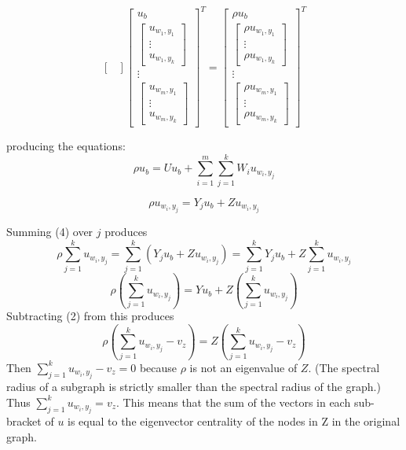 \documentclass{article}
\begin{document}
\[\begin{bmatrix}
\end{bmatrix}
 \begin{bmatrix}u_b \\
\begin{bmatrix} u_{w_1,y_1} \\ \vdots \\ u_{w_1,y_k}   \end{bmatrix} \\
\vdots \\
\begin{bmatrix} u_{w_m,y_1}  \\ \vdots \\ u_{w_m,y_k}   \end{bmatrix}
\end{bmatrix}^T
=
 \begin{bmatrix}\rho u_b \\
\begin{bmatrix} \rho u_{w_1,y_1} \\ \vdots \\ \rho u_{w_1,y_k}   \end{bmatrix} \\
\vdots \\
\begin{bmatrix} \rho u_{w_m,y_1}  \\ \vdots \\ \rho u_{w_m,y_k}   \end{bmatrix}
\end{bmatrix}^T
\]

producing the equations:
\begin{equation}
\rho u_b = Uu_b +\sum_{i=1}^{m}\sum_{j=1}^{k}W_iu_{w_i,y_j}
\end{equation}

\begin{equation}
\rho u_{w_i,y_j} = Y_ju_b +Zu_{w_i,y_j}
\end{equation}

Summing (4) over $j$ produces
\[
\rho \sum_{j=1}^{k} u_{w_i,y_j}
=
\sum_{j=1}^{k} (Y_ju_b +Zu_{w_i,y_j})
= \sum_{j=1}^{k} Y_ju_b + Z \sum_{j=1}^{k} u_{w_i,y_j}
\]
\[
\rho( \sum_{j=1}^{k} u_{w_i,y_j} )
= Yu_b + Z(\sum_{j=1}^{k} u_{w_i,y_j})
\]
Subtracting (2) from this produces
\[
\rho( \sum_{j=1}^{k} u_{w_i,y_j} - v_z)
= Z(\sum_{j=1}^{k} u_{w_i,y_j} - v_z)
\]
Then $\sum_{j=1}^{k} u_{w_i,y_j} - v_z = 0 $ because $\rho$ is not an eigenvalue of $Z$. (The spectral radius of a subgraph is strictly smaller than the spectral radius of the graph.)
Thus $\sum_{j=1}^{k} u_{w_i,y_j} = v_z$. This means that the sum of the vectors in each sub-bracket of $u$ is equal to the eigenvector centrality of the nodes in Z in the original graph.
\end{document}

